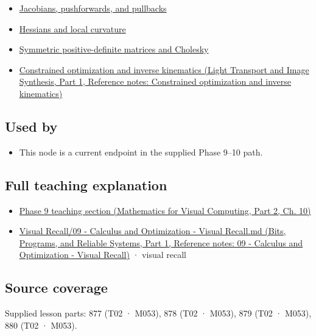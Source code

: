 \begin{itemize}
\tightlist
\item
  \hyperref[appendix-d8a7ddb675eb]{Jacobians, pushforwards, and pullbacks}
\item
  \hyperref[appendix-6ac071f8b50c]{Hessians and local curvature}
\item
  \hyperref[appendix-50d2ea3c9b26]{Symmetric positive-definite matrices and Cholesky}
\item
  \href{../04-Light-Transport-and-Image-Synthesis-P01/main.pdf\#appendix-29f4bea4c2bb}{Constrained optimization and inverse kinematics (Light Transport and Image Synthesis, Part 1, Reference notes: Constrained optimization and inverse kinematics)}
\end{itemize}

\subsection{Used by}\label{appendix-2c2df8345991-used-by}

\hypertarget{appendix-2c2df8345991-used-by}{}

\begin{itemize}
\tightlist
\item
  This node is a current endpoint in the supplied Phase 9--10 path.
\end{itemize}

\subsection{Full teaching explanation}\label{appendix-2c2df8345991-full-teaching-explanation}

\hypertarget{appendix-2c2df8345991-full-teaching-explanation}{}

\begin{itemize}
\tightlist
\item
  \href{../02-Mathematics-for-Visual-Computing-P02/main.pdf\#02-foundations-ii-ch026-optimization-and-inverse-problems}{Phase 9 teaching section (Mathematics for Visual Computing, Part 2, Ch. 10)}
\item
  \href{../01-Bits-Programs-and-Reliable-Systems-P01/main.pdf\#appendix-adf48f5dc5c1}{Visual Recall/09 - Calculus and Optimization - Visual Recall.md (Bits, Programs, and Reliable Systems, Part 1, Reference notes: 09 - Calculus and Optimization - Visual Recall)} · visual recall
\end{itemize}

\subsection{Source coverage}\label{appendix-2c2df8345991-source-coverage}

\hypertarget{appendix-2c2df8345991-source-coverage}{}

Supplied lesson parts: 877 (T02 · M053), 878 (T02 · M053), 879 (T02 · M053), 880 (T02 · M053).
